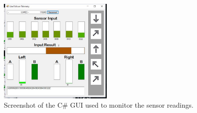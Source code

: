 \begin{figure}[h!]
  \centering
  \includegraphics[width=0.5\textwidth]{figures/guiexample.png}  
\caption{Screenshot of the C\# GUI used to monitor the sensor readings.}  
  \label{PID controller}
\end{figure}